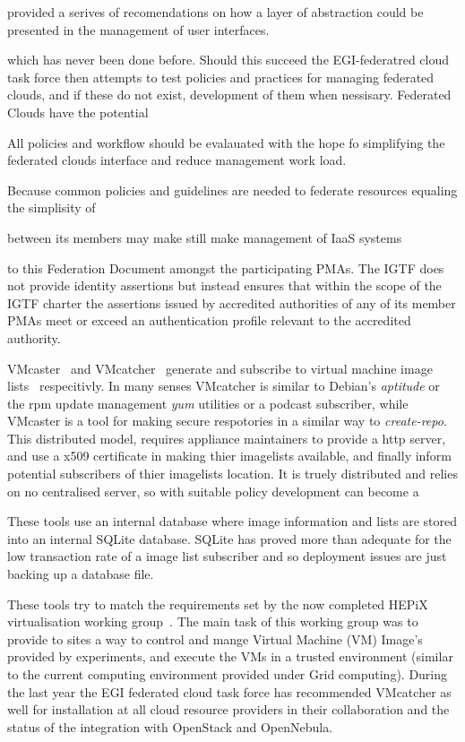 \documentclass{llncs_Ibergrid2013}
\begin{document}
provided a serives of recomendations on how a layer of abstraction could be presented in the management of user interfaces.


which has never been done before. Should this succeed the EGI-federatred cloud task force then attempts to test policies and practices for managing federated clouds, and if these do not exist, development of them when nessisary. Federated Clouds have the potential 

All policies and workflow should be evalauated with the hope fo simplifying the federated clouds interface and reduce management work load.

Because common policies and guidelines are needed to federate resources equaling the simplisity of 

between its members may make still make management of IaaS systems 


to this Federation Document amongst the participating PMAs. The IGTF does not provide identity assertions but instead ensures that within the scope of the IGTF charter the assertions issued by accredited authorities of any of its member PMAs meet or exceed an authentication profile relevant to the accredited authority.



VMcaster~\cite{vmcaster} and VMcatcher~\cite{vmcatcher} generate and subscribe to virtual machine image lists~\cite{hepix} respecitivly. In many senses VMcatcher is similar to Debian's \textit{aptitude} or the rpm update management \textit{yum} utilities or a podcast subscriber, while VMcaster is a tool for making secure respotories in a similar way to \textit{create-repo}. This distributed model, requires appliance maintainers to provide a http server, and use a x509 certificate in making thier imagelists available, and finally inform potential subscribers of thier imagelists location. It is truely distributed and relies on no centralised server, so with suitable policy development can become a 

These tools use an internal database where image information and lists are stored into an internal SQLite database.
SQLite has proved more than adequate for the low transaction rate of a image list subscriber and so deployment issues are just backing up a database file.

These tools try to match the requirements set by the now completed HEPiX virtualisation working group~\cite{hepix}.
The main task of this working group was to provide to sites a way to control and mange Virtual Machine (VM) Image's provided by experiments, and execute the VMs in a trusted environment (similar to the current computing environment provided under Grid computing). During the last year the EGI federated cloud task force has recommended VMcatcher as well for installation at all cloud resource providers in their collaboration and the status of the integration with OpenStack and OpenNebula.
\end{document}
